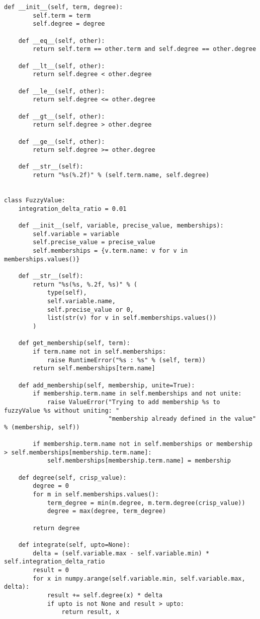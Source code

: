 \begin{lstlisting}[style=pythonstyle,caption={ }, label=lst:func:1]
	def __init__(self, term, degree):
		self.term = term
		self.degree = degree

	def __eq__(self, other):
		return self.term == other.term and self.degree == other.degree

	def __lt__(self, other):
		return self.degree < other.degree

	def __le__(self, other):
		return self.degree <= other.degree

	def __gt__(self, other):
		return self.degree > other.degree

	def __ge__(self, other):
		return self.degree >= other.degree

	def __str__(self):
		return "%s(%.2f)" % (self.term.name, self.degree)


class FuzzyValue:
	integration_delta_ratio = 0.01

	def __init__(self, variable, precise_value, memberships):
		self.variable = variable
		self.precise_value = precise_value
		self.memberships = {v.term.name: v for v in memberships.values()}

	def __str__(self):
		return "%s(%s, %.2f, %s)" % (
			type(self),
			self.variable.name,
			self.precise_value or 0,
			list(str(v) for v in self.memberships.values())
		)

	def get_membership(self, term):
		if term.name not in self.memberships:
			raise RuntimeError("%s : %s" % (self, term))
		return self.memberships[term.name]

	def add_membership(self, membership, unite=True):
		if membership.term.name in self.memberships and not unite:
			raise ValueError("Trying to add membership %s to fuzzyValue %s without uniting: "
							 "membership already defined in the value" % (membership, self))

		if membership.term.name not in self.memberships or membership > self.memberships[membership.term.name]:
			self.memberships[membership.term.name] = membership

	def degree(self, crisp_value):
		degree = 0
		for m in self.memberships.values():
			term_degree = min(m.degree, m.term.degree(crisp_value))
			degree = max(degree, term_degree)

		return degree

	def integrate(self, upto=None):
		delta = (self.variable.max - self.variable.min) * self.integration_delta_ratio
		result = 0
		for x in numpy.arange(self.variable.min, self.variable.max, delta):
			result += self.degree(x) * delta
			if upto is not None and result > upto:
				return result, x


\end{lstlisting}
